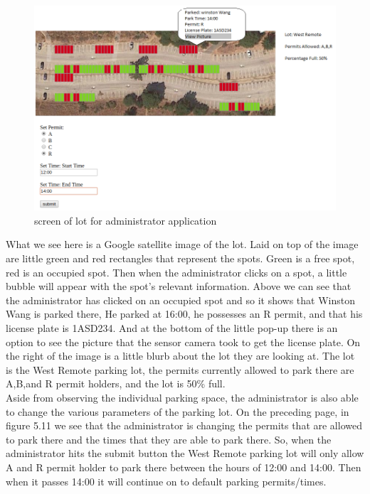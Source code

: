\documentclass[paper=a4, fontsize=12pt]{scrartcl}
\numberwithin{equation}{section}		%
\numberwithin{figure}{section}			%
\numberwithin{table}{section}				%
\begin{document}
\begin{figure}[]
\centering
\includegraphics[width=15cm]{adminAppPics/lotPic.png}
\caption{screen of lot for administrator application}
\label{adminLotScreen}
\end{figure}

What we see here is a Google satellite image of the lot. Laid on top of the image are little green and red rectangles that represent the spots. Green is a free spot, red is an occupied spot. Then when the administrator clicks on a spot, a little bubble will appear with the spot's relevant information. Above we can see that the administrator has clicked on an occupied spot and so it shows that Winston Wang is parked there, He parked at 16:00, he possesses an R permit, and that his license plate is 1ASD234. And at the bottom of the little pop-up there is an option to see the picture that the sensor camera took to get the license plate. On the right of the image is a little blurb about the lot they are looking at. The lot is the West Remote parking lot, the permits currently allowed to park there are A,B,and R permit holders, and the lot is 50\% full.\\

Aside from observing the individual parking space, the administrator is also able to change the various parameters of the parking lot. On the preceding page, in figure 5.11 we see that the administrator is changing the permits that are allowed to park there and the times that they are able to park there. So, when the administrator hits the submit button the West Remote parking lot will only allow A and R permit holder to park there between the hours of 12:00 and 14:00. Then when it passes 14:00 it will continue on to default parking permits/times.\\
\end{document}
